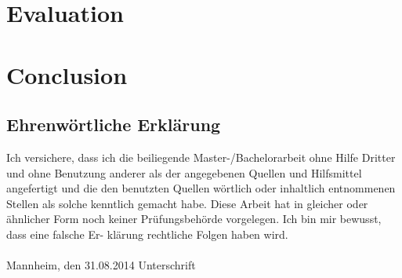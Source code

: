 \documentclass[a4paper, 11pt,titlepage,oneside,openany]{book}
\begin{document}
\chapter{Evaluation}
\chapter{Conclusion}

{}

\pagestyle{empty}

\newpage
\section*{Ehrenw\"ortliche Erkl\"arung}
Ich versichere, dass ich die beiliegende Master-/Bachelorarbeit ohne Hilfe Dritter
und ohne Benutzung anderer als der angegebenen Quellen und Hilfsmittel
angefertigt und die den benutzten Quellen w\"ortlich oder inhaltlich
entnommenen Stellen als solche kenntlich gemacht habe. Diese Arbeit
hat in gleicher oder \"ahnlicher Form noch keiner Pr\"ufungsbeh\"orde
vorgelegen. Ich bin mir bewusst, dass eine falsche Er- kl\"arung rechtliche Folgen haben
wird.
\\
\\

\noindent
Mannheim, den 31.08.2014 \hspace{4cm} Unterschrift
\end{document}
